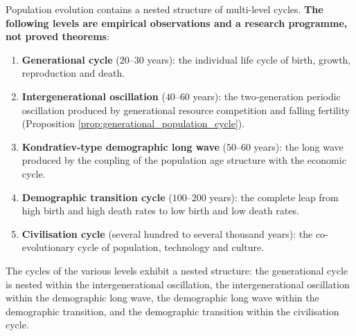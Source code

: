 \begin{remark}\label{thm:population_multi_cycle}
Population evolution contains a nested structure of multi-level cycles. \textbf{The following levels are empirical observations and a research programme, not proved theorems}:
\begin{enumerate}[label=(\roman*)]
    \item \textbf{Generational cycle} ($20$--$30$ years): the individual life cycle of birth, growth, reproduction and death.
    \item \textbf{Intergenerational oscillation} ($40$--$60$ years): the two-generation periodic oscillation produced by generational resource competition and falling fertility (Proposition \ref{prop:generational_population_cycle}).
    \item \textbf{Kondratiev-type demographic long wave} ($50$--$60$ years): the long wave produced by the coupling of the population age structure with the economic cycle.
    \item \textbf{Demographic transition cycle} ($100$--$200$ years): the complete leap from high birth and high death rates to low birth and low death rates.
    \item \textbf{Civilisation cycle} (several hundred to several thousand years): the co-evolutionary cycle of population, technology and culture.
\end{enumerate}
The cycles of the various levels exhibit a nested structure: the generational cycle is nested within the intergenerational oscillation, the intergenerational oscillation within the demographic long wave, the demographic long wave within the demographic transition, and the demographic transition within the civilisation cycle.


\end{remark}
